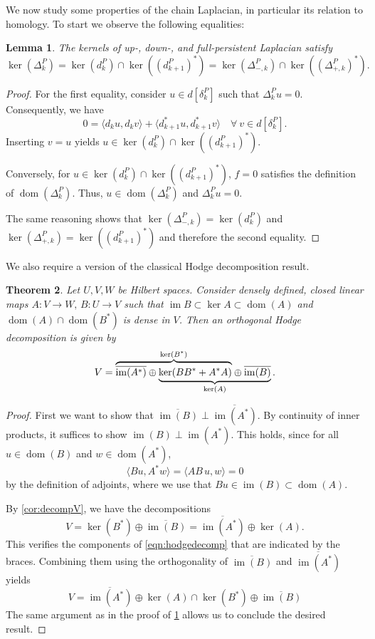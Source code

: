 \documentclass[11pt]{article}
\newtheorem{theorem}{Theorem}[section]
\newtheorem{lemma}[theorem]{Lemma}
\theoremstyle{definition}
\theoremstyle{remark}
\DeclareMathOperator\dom{dom}
\DeclareMathOperator{\im}{im}
\begin{document}
We now study some properties of the chain Laplacian, in particular its relation to homology. To start we observe the following equalities:
\begin{lemma} \label{lem:kerlap}
    The kernels of up-, down-, and full-persistent Laplacian satisfy
    $$
    \ker(\Delta_k^P) = \ker(d_k^P) \cap \ker\left((d_{k+1}^P)^*\right)=\ker(\Delta_{-,k}^P) \cap \ker\left((\Delta_{+,k}^P)^*\right).
$$
\end{lemma}

\begin{proof}
    For the first equality, consider $u \in d[\delta_k^P]$ such that $\Delta_k^P u =0$. Consequently, we have 
    $$
    0=\langle d_ku,d_kv\rangle+\langle d_{k+1}^*u,d_{k+1}^*v\rangle \quad \forall\ v \in d[\delta_k^P].
    $$
    Inserting $v=u$ yields $u \in \ker(d_k^P) \cap \ker\left((d_{k+1}^P)^*\right)$.
    
    Conversely, for $u \in \ker(d_k^P) \cap \ker\left((d_{k+1}^P)^*\right)$, $f=0$ satisfies the definition of $\dom(\Delta_k^P)$. Thus, $u \in \dom(\Delta_k^P)$ and $\Delta_k^P u=0$.
    
    The same reasoning shows that $\ker(\Delta_{-,k}^P)=\ker(d_k^P)$ and $\ker(\Delta_{+,k}^P)=\ker((d_{k+1}^P)^*)$ and therefore the second equality.
\end{proof}

We also require a version of the classical Hodge decomposition result.
\begin{theorem}\textnormal{\citep[Hodge Decomposition,][Lemma~2.1]{Hilbert}}
    \label{thm:magical}
    Let $U,V,W$ be Hilbert spaces. Consider densely defined, closed linear maps $A:V \to W,\, B:U \to V$ such that $\im B\subset \ker A \subset \dom(A)$ and $\dom(A) \cap \dom(B^*)$ is dense in $V$. Then an \emph{orthogonal Hodge decomposition} is given by
    \begin{align}
        V= \lefteqn{\overbrace{\phantom{\overline{\im(A^*)}\oplus\ker(BB^*+A^*A)}}^{\ker(B^*)}}\overline{\im(A^*)}\oplus\underbrace{\ker(BB^*+A^*A)\oplus\overline{\im(B)}}_{\ker(A)}. \label{eqn:hodgedecomp}
    \end{align}
\end{theorem}
\begin{proof}
    First we want to show that $\overline{\im(B)} \perp \overline{\im(A^*)}$. By continuity of inner products, it suffices to show $\im(B) \perp \im(A^*)$. This holds, since for all $u \in \dom(B)$ and $w \in \dom(A^*)$,
    $$
        \langle Bu, A^* w \rangle = \langle AB \,u,w \rangle =0
    $$
    by the definition of adjoints, where we use that $Bu \in \im(B)\subset \dom(A)$.
    
    By \cref{cor:decompV}, we have the decompositions
   $$
        V=\ker(B^*)\oplus \overline{\im(B)} = \overline{\im(A^*)} \oplus \ker(A).
    $$
    This verifies the components of \cref{eqn:hodgedecomp} that are indicated by the braces. Combining them using the orthogonality of $\overline{\im(B)}$ and $\overline{\im(A^*)}$ yields
    $$
        V= \overline{\im(A^*)} \oplus \ker(A) \cap \ker(B^*)\oplus \overline{\im(B)}
    $$
    The same argument as in the proof of \cref{lem:kerlap} allows us to conclude the desired result.
\end{proof}
\end{document}
